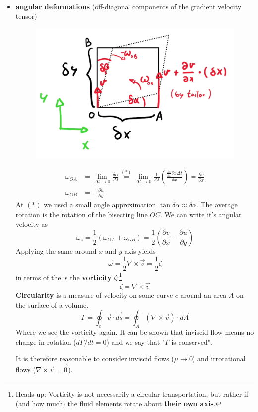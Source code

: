 \begin{itemize}
\begin{equation*}
\begin{split}
	\end{split}
	\end{equation*}
	\item \textbf{angular deformations} (off-diagonal components of the gradient velocity tensor)
	\begin{figure}[H]
		\centering
		\includegraphics[width=0.4\linewidth]{Sketches/angular_deformations}
		\caption{}
		\label{fig:angulardeformations}
	\end{figure}
	\begin{equation*}
		\begin{split}
			\omega_{OA} &= \lim_{\Delta t \to 0}  \frac{\delta \alpha}{\Delta t} \stackrel{(*)}= \lim_{\Delta t \to 0} \frac{1}{\Delta t} \left(\frac{\frac{\partial v}{\partial x}\delta x \Delta t}{\delta x}\right) = \frac{\partial v}{\partial x}\\
			\omega_{OB} &= -\frac{\partial u}{\partial y}
		\end{split}
	\end{equation*}
	At $(*)$ we used a small angle approximation $\tan\delta \alpha \approx \delta \alpha$. The average rotation is the rotation of the bisecting line $\overline {OC}$. We can write it's angular velocity as
	\begin{equation*}
		\omega_z = \frac 12 \left(\omega_{OA}+\omega_{OB}\right) = \frac 12 \left(\frac{\partial v}{\partial x} - \frac{\partial u}{\partial y}\right)
	\end{equation*}
	Applying the same around $x$ and $y$ axis yields
	\begin{equation*}
		\vec \omega = \frac 12 \nabla \times \vec v = \frac 12 \zeta
	\end{equation*}
	in terms of the is the \textbf{vorticity} $\zeta$:\footnote{Heads up: Vorticity is not necessarily a circular transportation, but rather if (and how much) the fluid elements rotate about \textbf{their own axis}.}
	\begin{equation*}
		\boxed{\zeta = \nabla \times \vec v}
	\end{equation*}
	\textbf{Circularity} is a measure of velocity on some curve $c$ around an area $A$ on the surface of a volume.
	\begin{equation*}
		\Gamma = \oint_{c} \vec v \cdot \vec{ds} = \oint_{A} (\nabla \times \vec v )\cdot \vec{dA}
	\end{equation*}
	Where we see the vorticity again.
	It can be shown that inviscid flow means no change in rotation ($d\Gamma/dt=0$) and we say that "$\Gamma$ is conserved".
	
	It is therefore reasonable to consider inviscid flows ($\mu \to 0$) and irrotational flows ($\nabla \times \vec v = \vec 0$).
\end{itemize}



